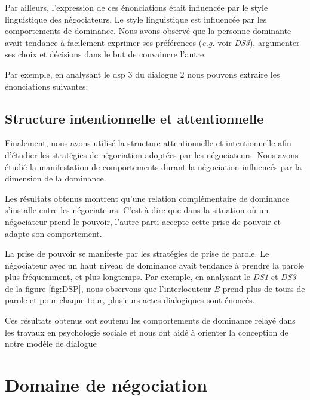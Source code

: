 Par ailleurs, l'expression de ces énonciations était influencée par le style linguistique des négociateurs.  Le style linguistique est influencée par les comportements de dominance. Nous avons observé que la personne dominante avait tendance à facilement exprimer ses préférences (\emph{e.g.} voir \emph{DS3}), argumenter ses choix et décisions dans le but de convaincre l'autre.  


Par exemple, en analysant le dsp 3 du dialogue 2 nous pouvons extraire les énonciations suivantes: 

\subsection{Structure intentionnelle et attentionnelle}	  

Finalement, nous avons utilisé la structure attentionnelle et intentionnelle afin d'étudier les stratégies de négociation adoptées par les négociateurs. Nous avons étudié la manifestation de comportements durant la négociation influencés par la dimension de la dominance.

Les résultats obtenus montrent qu'une relation complémentaire de dominance s'installe entre les négociateurs. C'est à dire que dans la situation où un négociateur prend le pouvoir, l'autre parti accepte cette prise de pouvoir et adapte son comportement.

La prise de pouvoir se manifeste par les stratégies de prise de parole. Le négociateur avec un haut niveau de dominance avait tendance à prendre la parole plus fréquemment, et plus longtemps. Par exemple, en analysant le \emph{DS1} et \emph{DS3} de la figure \ref{fig:DSP}, nous observons que l'interlocuteur \textit{B} prend plus de tours de parole et pour chaque tour, plusieurs actes dialogiques sont énoncés. 


Ces résultats obtenus ont soutenu les comportements de dominance relayé dans les travaux en psychologie sociale et nous ont aidé à orienter la conception de notre modèle de dialogue



\section{Domaine de négociation}
\label{domaine}


